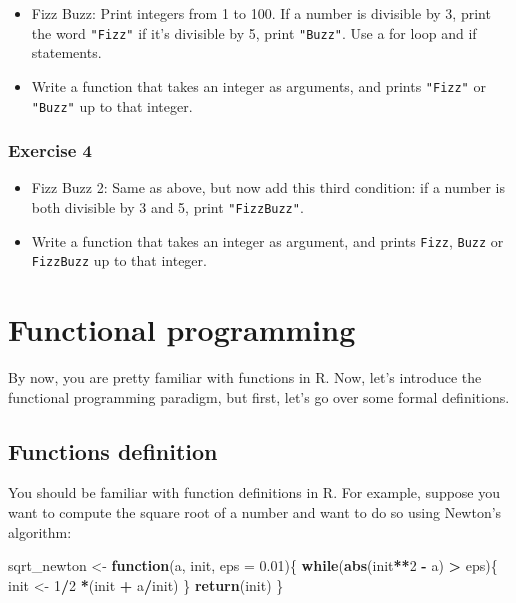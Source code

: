 \documentclass[]{gitbook}
\newenvironment{Shaded}{\begin{snugshade}}{\end{snugshade}}
\newcommand{\ControlFlowTok}[1]{\textcolor[rgb]{0.13,0.29,0.53}{\textbf{#1}}}
\newcommand{\DataTypeTok}[1]{\textcolor[rgb]{0.13,0.29,0.53}{#1}}
\newcommand{\DecValTok}[1]{\textcolor[rgb]{0.00,0.00,0.81}{#1}}
\newcommand{\FloatTok}[1]{\textcolor[rgb]{0.00,0.00,0.81}{#1}}
\newcommand{\KeywordTok}[1]{\textcolor[rgb]{0.13,0.29,0.53}{\textbf{#1}}}
\newcommand{\NormalTok}[1]{#1}
\newcommand{\OperatorTok}[1]{\textcolor[rgb]{0.81,0.36,0.00}{\textbf{#1}}}
\newcommand{\StringTok}[1]{\textcolor[rgb]{0.31,0.60,0.02}{#1}}
\begin{document}
\begin{itemize}
\item
  Fizz Buzz: Print integers from 1 to 100. If a number is divisible by 3, print the word \texttt{"Fizz"} if
  it's divisible by 5, print \texttt{"Buzz"}. Use a for loop and if statements.
\item
  Write a function that takes an integer as arguments, and prints \texttt{"Fizz"} or \texttt{"Buzz"} up to that integer.
\end{itemize}

\hypertarget{exercise-4-1}{%
\subsubsection*{Exercise 4}\label{exercise-4-1}}

\begin{itemize}
\item
  Fizz Buzz 2: Same as above, but now add this third condition: if a number is both divisible by 3 and 5, print \texttt{"FizzBuzz"}.
\item
  Write a function that takes an integer as argument, and prints \texttt{Fizz}, \texttt{Buzz} or \texttt{FizzBuzz} up to that integer.
\end{itemize}

\hypertarget{functional-programming}{%
\section{Functional programming}\label{functional-programming}}

By now, you are pretty familiar with functions in R. Now, let's introduce the functional programming
paradigm, but first, let's go over some formal definitions.

\hypertarget{functions-definition}{%
\subsection{Functions definition}\label{functions-definition}}

You should be familiar with function definitions in R. For example, suppose you want to compute
the square root of a number and want to do so using Newton's algorithm:

\begin{Shaded}
\begin{Highlighting}[]
\NormalTok{sqrt_newton <-}\StringTok{ }\ControlFlowTok{function}\NormalTok{(a, init, }\DataTypeTok{eps =} \FloatTok{0.01}\NormalTok{)\{}
    \ControlFlowTok{while}\NormalTok{(}\KeywordTok{abs}\NormalTok{(init}\OperatorTok{**}\DecValTok{2} \OperatorTok{-}\StringTok{ }\NormalTok{a) }\OperatorTok{>}\StringTok{ }\NormalTok{eps)\{}
\NormalTok{        init <-}\StringTok{ }\DecValTok{1}\OperatorTok{/}\DecValTok{2} \OperatorTok{*}\NormalTok{(init }\OperatorTok{+}\StringTok{ }\NormalTok{a}\OperatorTok{/}\NormalTok{init)}
\NormalTok{    \}}
    \KeywordTok{return}\NormalTok{(init)}
\NormalTok{\}}
\end{Highlighting}
\end{Shaded}
\end{document}
